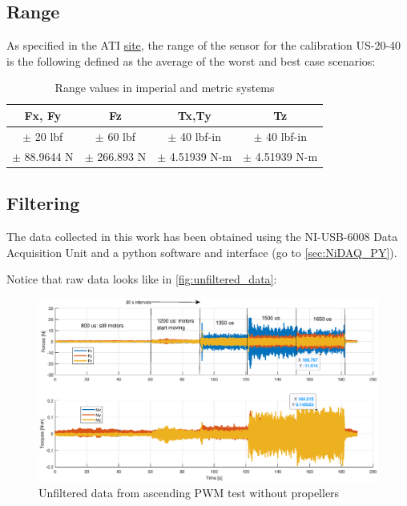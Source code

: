 \documentclass[a4paper]{article}
\begin{document}
\subsection{Range}
As specified in the ATI \hyperref{https://www.ati-ia.com/products/ft/ft_models.aspx?id=mini40}{category}{name}{site}, the range of the sensor for the calibration US-20-40 is the following defined as the average of the worst and best case
scenarios:

\begin{table}[h!]
	\centering
	\caption{Range values in imperial and metric systems\label{tab:range}}
	\begin{tabular}{||c | c | c | c||} 
		\hline
		Fx, Fy & Fz & Tx,Ty & Tz \\ [0.5ex] 
		\hline\hline
		$\pm$ 20 lbf & $\pm$ 60 lbf & $\pm$ 40 lbf-in & $\pm$ 40 lbf-in\\ 
		\hline
		$\pm$ 88.9644 N & $\pm$ 266.893 N & $\pm$ 4.51939 N-m & $\pm$ 4.51939 N-m \\
		\hline
		
	\end{tabular}
\end{table}

\subsection{Filtering}

The data collected in this work has been obtained using the NI-USB-6008 Data Acquisition Unit and a python software and interface (go to \autoref{sec:NiDAQ_PY}).

Notice that raw data looks like in \autoref{fig:unfiltered_data}:

\begin{figure}[h!]
	\centering
	\includegraphics[width=1\textwidth]{Images/unfiltered_20230915.eps}
	\caption{Unfiltered data from ascending PWM test without propellers}
	\label{fig:unfiltered_noprops}
\end{figure}
\end{document}
